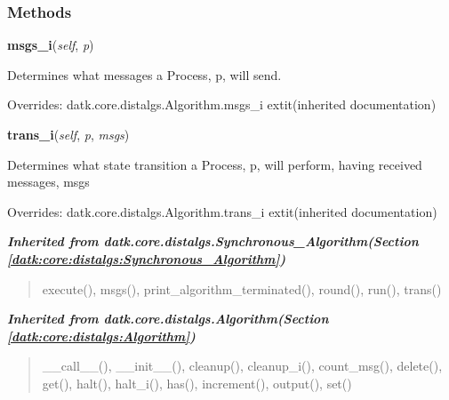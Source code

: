   \subsubsection{Methods}

    \vspace{0.5ex}

\hspace{.8\funcindent}\begin{boxedminipage}{\funcwidth}

    \raggedright \textbf{msgs\_i}(\textit{self}, \textit{p})

\setlength{\parskip}{2ex}
    Determines what messages a Process, p, will send.

\setlength{\parskip}{1ex}
      Overrides: datk.core.distalgs.Algorithm.msgs\_i 	extit{(inherited documentation)}

    \end{boxedminipage}

    \vspace{0.5ex}

\hspace{.8\funcindent}\begin{boxedminipage}{\funcwidth}

    \raggedright \textbf{trans\_i}(\textit{self}, \textit{p}, \textit{msgs})

\setlength{\parskip}{2ex}
    Determines what state transition a Process, p, will perform, having 
    received messages, msgs

\setlength{\parskip}{1ex}
      Overrides: datk.core.distalgs.Algorithm.trans\_i 	extit{(inherited documentation)}

    \end{boxedminipage}


\large{\textbf{\textit{Inherited from datk.core.distalgs.Synchronous\_Algorithm\textit{(Section \ref{datk:core:distalgs:Synchronous_Algorithm})}}}}

\begin{quote}
execute(), msgs(), print\_algorithm\_terminated(), round(), run(), trans()
\end{quote}

\large{\textbf{\textit{Inherited from datk.core.distalgs.Algorithm\textit{(Section \ref{datk:core:distalgs:Algorithm})}}}}

\begin{quote}
\_\_call\_\_(), \_\_init\_\_(), cleanup(), cleanup\_i(), count\_msg(), delete(), get(), halt(), halt\_i(), has(), increment(), output(), set()
\end{quote}

